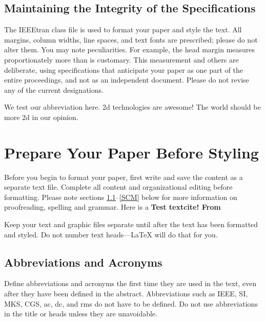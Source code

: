 \documentclass[conference]{IEEEtran}
\begin{document}
\subsection{Maintaining the Integrity of the Specifications}

The IEEEtran class file is used to format your paper and style the text. All margins,
column widths, line spaces, and text fonts are prescribed; please do not
alter them. You may note peculiarities. For example, the head margin
measures proportionately more than is customary. This measurement
and others are deliberate, using specifications that anticipate your paper
as one part of the entire proceedings, and not as an independent document.
Please do not revise any of the current designations.

We test our abbreviation here. \gls{2d} technologies are awesome! The world should be more \gls{2d} in our opinion.
\section{Prepare Your Paper Before Styling}
Before you begin to format your paper, first write and save the content as a
separate text file. Complete all content and organizational editing before
formatting. Please note sections \ref{AA}--\ref{SCM} below for more information on
proofreading, spelling and grammar. Here is a \bf{Test textcite}! From \textcite{b1}

Keep your text and graphic files separate until after the text has been
formatted and styled. Do not number text heads---{\LaTeX} will do that
for you.

\subsection{Abbreviations and Acronyms}\label{AA}
Define abbreviations and acronyms the first time they are used in the text,
even after they have been defined in the abstract. Abbreviations such as
IEEE, SI, MKS, CGS, ac, dc, and rms do not have to be defined. Do not use
abbreviations in the title or heads unless they are unavoidable.
\end{document}
